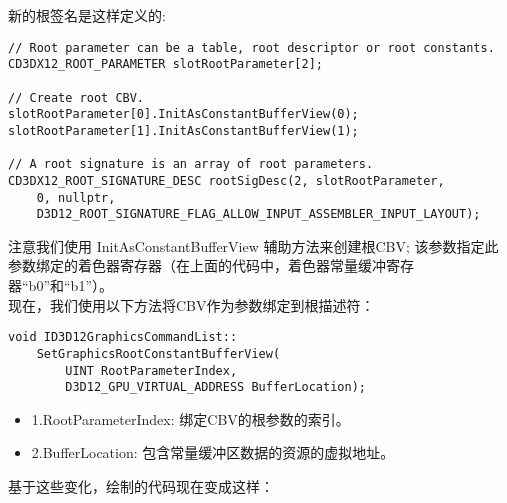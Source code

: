 \begin{flushleft}
新的根签名是这样定义的:\\
\end{flushleft}

\begin{lstlisting}
// Root parameter can be a table, root descriptor or root constants.
CD3DX12_ROOT_PARAMETER slotRootParameter[2];

// Create root CBV.
slotRootParameter[0].InitAsConstantBufferView(0);
slotRootParameter[1].InitAsConstantBufferView(1);

// A root signature is an array of root parameters.
CD3DX12_ROOT_SIGNATURE_DESC rootSigDesc(2, slotRootParameter, 
    0, nullptr, 
    D3D12_ROOT_SIGNATURE_FLAG_ALLOW_INPUT_ASSEMBLER_INPUT_LAYOUT);
\end{lstlisting}

\begin{flushleft}
注意我们使用 InitAsConstantBufferView 辅助方法来创建根CBV; 该参数指定此参数绑定的着色器寄存器（在上面的代码中，着色器常量缓冲寄存器“b0”和“b1”）。\\
现在，我们使用以下方法将CBV作为参数绑定到根描述符：\\
\end{flushleft}

\begin{lstlisting}
void ID3D12GraphicsCommandList::
    SetGraphicsRootConstantBufferView(
        UINT RootParameterIndex,
        D3D12_GPU_VIRTUAL_ADDRESS BufferLocation);
\end{lstlisting}

\begin{itemize}
  \item 1.RootParameterIndex: 绑定CBV的根参数的索引。
  \item 2.BufferLocation: 包含常量缓冲区数据的资源的虚拟地址。
\end{itemize}

\begin{flushleft}
基于这些变化，绘制的代码现在变成这样：\\
\end{flushleft}

